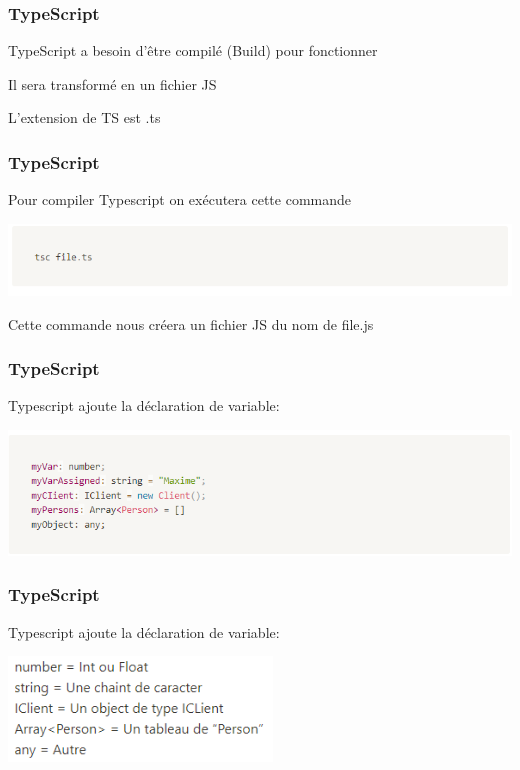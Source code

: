 \documentclass[10pt]{beamer}
\begin{document}
	\begin{frame}
		\frametitle{TypeScript}

		TypeScript a besoin d’être compilé (Build) pour fonctionner  \newline \newline

		Il sera transformé en un fichier JS  \newline \newline

		L’extension de TS est .ts

	\end{frame}

	\begin{frame}
		\frametitle{TypeScript}

		Pour compiler Typescript on exécutera cette commande \newline \newline


		\includegraphics[width=15cm]{assets/tsbuild}\newline


		Cette commande nous créera un fichier JS du nom de file.js

	\end{frame}

	\begin{frame}
		\frametitle{TypeScript}

		Typescript ajoute la déclaration de variable: \newline \newline


		\includegraphics[width=15cm]{assets/tsvariable}\newline


	\end{frame}

	\begin{frame}
		\frametitle{TypeScript}

		Typescript ajoute la déclaration de variable: \newline \newline

		\centering
		\includegraphics[width=7cm]{assets/tsvariable2}\newline


	\end{frame}
\end{document}
